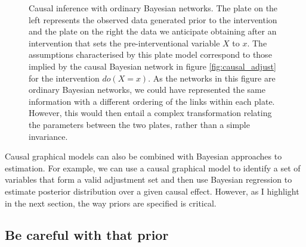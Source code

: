 \documentclass[11pt,a4paper,twoside]{report}
\theoremstyle{plain}
\theoremstyle{definition}
\begin{document}
\begin{figure}[ht]
\center
{} 
\caption{Causal inference with ordinary Bayesian networks. The plate on the left represents the observed data generated prior to the intervention and the plate on the right the data we anticipate obtaining after an intervention that sets the pre-interventional variable $X$ to $x$. The assumptions characterised by this plate model correspond to those implied by the causal Bayesian network in figure \ref{fig:causal_adjust} for the intervention $do(X=x)$. As the networks in this figure are ordinary Bayesian networks, we could have represented the same information with a different ordering of the links within each plate. However, this would then entail a complex transformation relating the parameters between the two plates, rather than a simple invariance.}
\label{fig:causal_ordinary_bayes}
\end{figure}

Causal graphical models can also be combined with Bayesian approaches to estimation. For example, we can use a causal graphical model to identify a set of variables that form a valid adjustment set and then use Bayesian regression to estimate posterior distribution over a given causal effect. However, as I highlight in the next section, the way priors are specified is critical.

\subsection{Be careful with that prior}
\end{document}
